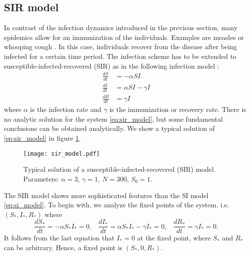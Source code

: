 \documentclass[openright,twoside,headsepline]{scrbook}
\begin{document}
\subsection{SIR model}\label{sec:sir_model}
In contrast of the infection dynamics introduced in the previous section, many epidemics allow for an immunization of the individuals.
Examples are measles or whooping cough \cite{grenfell:92} \cite{andersonmay:92}.
In this case, individuals recover from the disease after being infected for a certain time period.
The infection scheme has to be extended to susceptible-infected-recovered (SIR) as in the following infection model \cite{kermack:27}:
\begin{align}\label{eq:sir_model}
\frac{dS}{dt} &= -\alpha SI \nonumber \\
\frac{dI}{dt} &= \alpha SI -\gamma I \nonumber \\
\frac{dR}{dt} &= \gamma I
\end{align}
where $\alpha $ is the infection rate and $\gamma $ is the immunization or recovery rate.
There is no analytic solution for the system \eqref{eq:sir_model}, but some fundamental conclusions can be obtained analytically.
We show a typical solution of \eqref{eq:sir_model} in figure \ref{fig:std_sir_model}.
%
\begin{figure}[htbp]
\begin{center}
\texttt{[image: sir\_model.pdf]}
\caption{Typical solution of a susceptible-infected-recovered (SIR) model. Parameters: $\alpha = 3$, $\gamma = 1$, $N=300$, $S_0=1$.}
\label{fig:std_sir_model}
\end{center}
\end{figure}
%

The SIR model shows more sophisticated features than the SI model \eqref{eq:si_model}.
To begin with, we analyze the fixed points of the system, i.e. $(S_*,I_*,R_*)$ where
\begin{equation}
\frac{dS_*}{dt} = -\alpha S_*I_* =0 ,\; \;\;
\frac{dI_*}{dt} = \alpha S_*I_* -\gamma I_* =0,\; \;\;
\frac{dR_*}{dt} = \gamma I_* = 0.
\end{equation}
It follows from the last equation that $I_*=0$ at the fixed point, where $S_*$ and $R_*$ can be arbitrary.
Hence, a fixed point is $(S_*,0,R_*)$.
\end{document}
